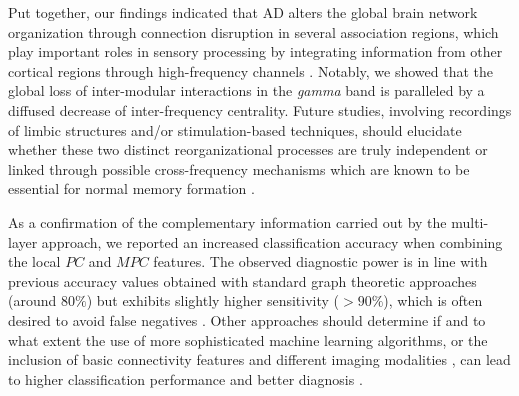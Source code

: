 Put together, our findings indicated that AD alters the global brain network organization through connection disruption in several association regions, which play important roles in sensory processing by integrating information from other cortical regions through high-frequency channels \citep{miltner_coherence_1999-1,buschman_top-down_2007, siegel_neuronal_2008, gregoriou_high-frequency_2009, hipp_oscillatory_2011}.
%
Notably, we showed that the global loss of inter-modular interactions in the \textit{gamma} band is paralleled by a diffused decrease of inter-frequency centrality.
Future studies, involving recordings of limbic structures and/or stimulation-based techniques, should elucidate whether these two distinct reorganizational processes are truly independent or linked through possible cross-frequency mechanisms which are known to be essential for normal memory formation \citep{canolty_high_2006,axmacher_cross-frequency_2010, goutagny_alterations_2013}.



As a confirmation of the complementary information carried out by the multi-layer approach, we reported an increased classification accuracy when combining the local $PC$ and $MPC$ features.
The observed diagnostic power is in line with previous accuracy values obtained with standard graph theoretic approaches (around $80\%$) but exhibits slightly higher sensitivity ($>90\%$), which is often desired to avoid false negatives \citep{li_discriminant_2012, wang_disrupted_2013, wee_enriched_2011, wee_identification_2012, horwitz_functional_2011}.
Other approaches should determine if and to what extent the use of more sophisticated machine learning algorithms, or the inclusion of basic connectivity features \citep{hutchison_network-based_2011, shao_prediction_2012, zhou_hierarchical_2011} and different imaging modalities \citep{dai_discriminative_2012}, can lead to higher classification performance and better diagnosis \citep{tijms_alzheimers_2013}.


